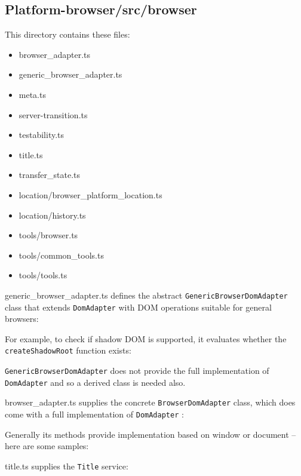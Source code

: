 \subsection{Platform-browser/src/browser}

This directory contains these files:

\begin{itemize}
  \item browser\_adapter.ts
  \item generic\_browser\_adapter.ts
  \item meta.ts
  \item server-transition.ts
  \item testability.ts
  \item title.ts
  \item transfer\_state.ts
  \item location/browser\_platform\_location.ts
  \item location/history.ts
  \item tools/browser.ts
  \item tools/common\_tools.ts
  \item tools/tools.ts
\end{itemize}

generic\_browser\_adapter.ts defines the abstract
\texttt{GenericBrowserDomAdapter}
class
that extends
\texttt{DomAdapter}
with DOM operations suitable for general browsers:



For example, to check if shadow DOM is supported, it evaluates whether the
\texttt{createShadowRoot}
function exists:



\texttt{GenericBrowserDomAdapter}
does not provide the full implementation of
\texttt{DomAdapter}
and so a derived class is needed also.

browser\_adapter.ts supplies the concrete
\texttt{BrowserDomAdapter}
class, which does come
with a full implementation of
\texttt{DomAdapter}
:



Generally its methods provide implementation based on window or document – here
are some samples:



title.ts supplies the
\texttt{Title}
service:


